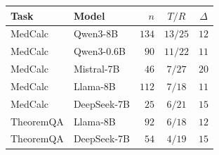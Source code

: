 \begin{tabular}{@{}llrcc@{}}
\toprule
\textbf{Task} & \textbf{Model} & $n$ & $T/R$ & $\Delta$ \\
\midrule
MedCalc & Qwen3-8B & $134$ & $13/25$ & $12$ \\
MedCalc & Qwen3-0.6B & $90$ & $11/22$ & $11$ \\
MedCalc & Mistral-7B & $46$ & $7/27$ & $20$ \\
MedCalc & Llama-8B & $112$ & $7/18$ & $11$ \\
MedCalc & DeepSeek-7B & $25$ & $6/21$ & $15$ \\
\midrule
TheoremQA & Llama-8B & $92$ & $6/18$ & $12$ \\
TheoremQA & DeepSeek-7B & $54$ & $4/19$ & $15$ \\
\bottomrule
\end{tabular}
